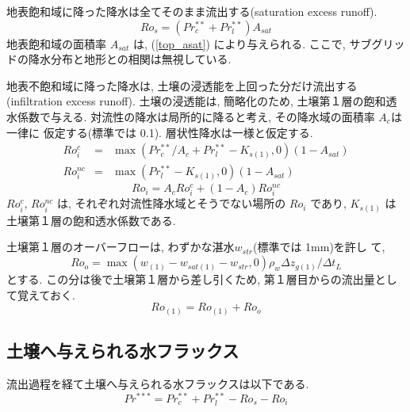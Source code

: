 地表飽和域に降った降水は全てそのまま流出する(saturation excess runoff).
\begin{equation}
 Ro_s = (Pr_c^{**} + Pr_l^{**}) A_{sat}
\end{equation}
地表飽和域の面積率 $A_{sat}$ は, (\ref{top_asat}) により与えられる.
ここで, サブグリッドの降水分布と地形との相関は無視している.

地表不飽和域に降った降水は, 土壌の浸透能を上回った分だけ流出する
(infiltration excess runoff).
土壌の浸透能は, 簡略化のため, 土壌第１層の飽和透水係数で与える.
対流性の降水は局所的に降ると考え, その降水域の面積率 $A_c$は一律に
仮定する(標準では 0.1). 層状性降水は一様と仮定する.
\begin{eqnarray}
 Ro_i^c &=& \max( Pr_c^{**}/A_c + Pr_l^{**} - K_{s(1)}, 0 ) (1 - A_{sat}) \\
 Ro_i^{nc} &=& \max( Pr_l^{**} - K_{s(1)}, 0 ) (1 - A_{sat})
\end{eqnarray}
\begin{equation}
 Ro_i = A_c Ro_i^c + ( 1 - A_c ) Ro_i^{nc}
\end{equation}
$Ro_i^c$, $Ro_i^{nc}$ は, それぞれ対流性降水域とそうでない場所の $Ro_i$
であり, $K_{s(1)}$ は土壌第１層の飽和透水係数である.

土壌第１層のオーバーフローは, わずかな湛水$w_{str}$(標準では 1mm)を許し
て,
\begin{equation}
 Ro_o = \max(w_{(1)} - w_{sat(1)} - w_{str}, 0) \rho_w \Delta z_{g(1)} / \Delta t_L
\end{equation}
とする. この分は後で土壌第１層から差し引くため, 第１層目からの流出量とし
て覚えておく.
\begin{equation}
 Ro_{(1)} = Ro_{(1)} + Ro_o
\end{equation}

\subsection{土壌へ与えられる水フラックス}

流出過程を経て土壌へ与えられる水フラックスは以下である.
\begin{equation}
 Pr^{***} = Pr^{**}_c + Pr^{**}_l - Ro_s - Ro_i
\end{equation}
